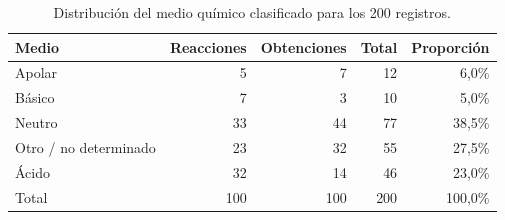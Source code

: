 \begin{table}[!t]
\centering
\begin{threeparttable}
\caption{Distribución del medio químico clasificado para los 200 registros.}
\label{tab:medio}
\footnotesize
\begin{tabular}{lrrrr}
\toprule
Medio & Reacciones & Obtenciones & Total & Proporción \\
\midrule
Apolar & 5 & 7 & 12 & 6,0\% \\
Básico & 7 & 3 & 10 & 5,0\% \\
Neutro & 33 & 44 & 77 & 38,5\% \\
Otro / no determinado & 23 & 32 & 55 & 27,5\% \\
Ácido & 32 & 14 & 46 & 23,0\% \\
\midrule
Total & 100 & 100 & 200 & 100,0\% \\
\bottomrule
\end{tabular}
\end{threeparttable}
\end{table}
